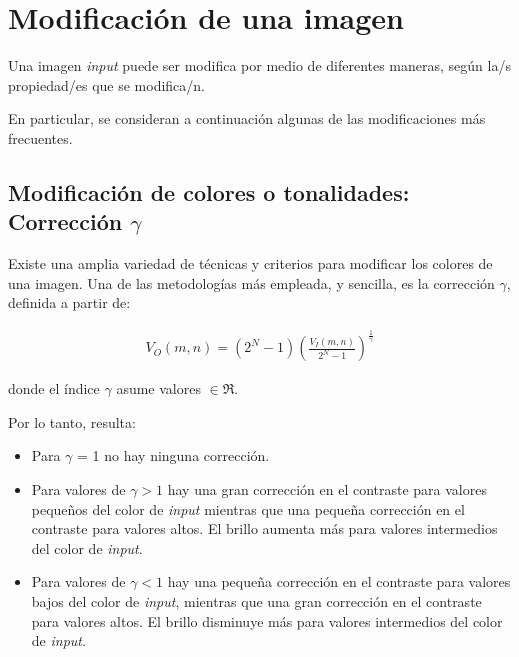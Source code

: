 \section{Modificaci\'on de una imagen}

Una imagen \textit{input} puede ser modifica por medio de diferentes maneras, seg\'un la/s propiedad/es que se modifica/n.
%

%
En particular, se consideran a continuaci\'on algunas de las modificaciones m\'as frecuentes.

\subsection{Modificaci\'on de colores o tonalidades: Correcci\'on $\gamma$}

Existe una amplia variedad de t\'ecnicas y criterios para modificar los colores de una imagen.
%
Una de las metodolog\'ias m\'as empleada, y sencilla, es la correcci\'on $\gamma$, definida a partir de:

\begin{eqnarray}
	V_{O}(m, n) = \left( 2^{N} - 1 \right) \left( \frac{V_{I}(m, n)}{2^{N} -1} \right)^{\frac{1}{\gamma}}
\label{EqXXVI}
\end{eqnarray}

donde el \'indice $\gamma$ asume valores $\in \Re$.
%

%
Por lo tanto, resulta:

\begin{itemize}
 \item Para $\gamma$ = 1 no hay ninguna correcci\'on.
 \item Para valores de $\gamma > 1$ hay una gran correcci\'on en el contraste para valores peque\~nos del color de \textit{input} mientras que una 
 peque\~na correcci\'on en el contraste para valores altos. El brillo aumenta m\'as para valores intermedios del color de \textit{input}.
 \item Para valores de $\gamma < 1$ hay una peque\~na correcci\'on en el contraste para valores bajos del color de \textit{input}, mientras que una 
 gran correcci\'on en el contraste para valores altos. El brillo disminuye m\'as para valores intermedios del color de \textit{input}.
\end{itemize}



